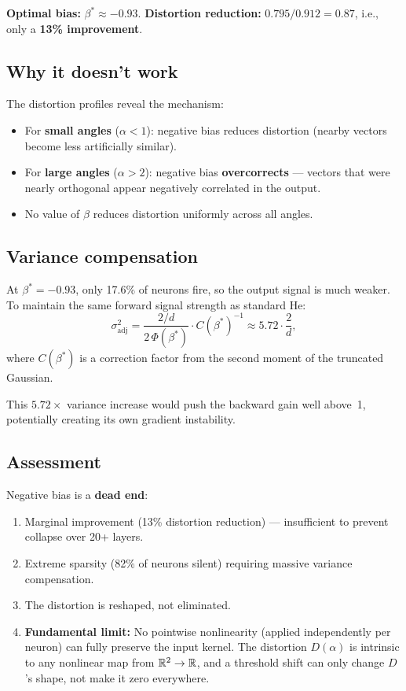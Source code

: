 \textbf{Optimal bias:} $\beta^* \approx -0.93$.
\textbf{Distortion reduction:} $0.795 / 0.912 = 0.87$, i.e., only a
\textbf{13\% improvement}.

\subsection{Why it doesn't work}

The distortion profiles reveal the mechanism:
\begin{itemize}
  \item For \textbf{small angles} ($\alpha < 1$): negative bias reduces
        distortion (nearby vectors become less artificially similar).
  \item For \textbf{large angles} ($\alpha > 2$): negative bias
        \textbf{overcorrects} --- vectors that were nearly orthogonal
        appear negatively correlated in the output.
  \item No value of $\beta$ reduces distortion uniformly across all
        angles.
\end{itemize}

\subsection{Variance compensation}

At $\beta^* = -0.93$, only 17.6\% of neurons fire, so the output
signal is much weaker.  To maintain the same forward signal strength
as standard He:
\[
  \sigma^2_{\mathrm{adj}}
  = \frac{2/d}{2\,\Phi(\beta^*)} \cdot C(\beta^*)^{-1}
  \approx 5.72 \cdot \frac{2}{d},
\]
where $C(\beta^*)$ is a correction factor from the second moment of
the truncated Gaussian.

This $5.72\times$ variance increase would push the backward gain
well above~1, potentially creating its own gradient instability.

\subsection{Assessment}

Negative bias is a \textbf{dead end}:
\begin{enumerate}
  \item Marginal improvement (13\% distortion reduction) ---
        insufficient to prevent collapse over 20+ layers.
  \item Extreme sparsity (82\% of neurons silent) requiring massive
        variance compensation.
  \item The distortion is reshaped, not eliminated.
  \item \textbf{Fundamental limit:} No pointwise nonlinearity
        (applied independently per neuron) can fully preserve the input
        kernel.  The distortion $D(\alpha)$ is intrinsic to any
        nonlinear map from $\mathbb{R}^2 \to \mathbb{R}$, and a threshold shift can
        only change $D$'s shape, not make it zero everywhere.
\end{enumerate}

